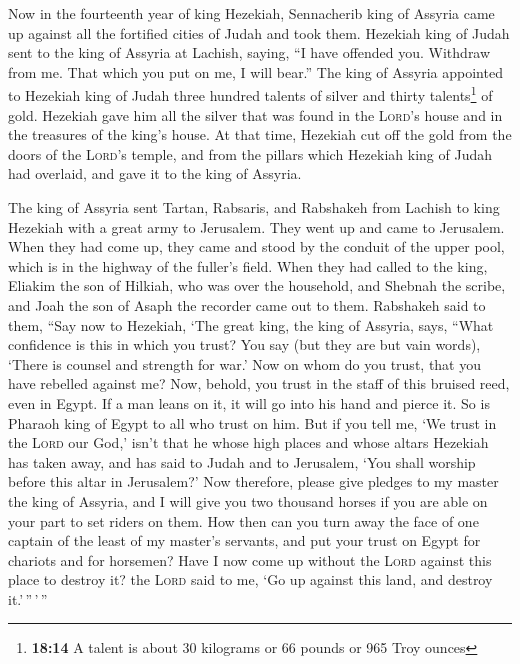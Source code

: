  Now in the fourteenth year of king Hezekiah, Sennacherib
king of Assyria came up against all the fortified cities of Judah and
took them.  Hezekiah king of Judah sent to the king of
Assyria at Lachish, saying, ``I have offended you. Withdraw from me.
That which you put on me, I will bear.'' The king of Assyria appointed
to Hezekiah king of Judah three hundred talents of silver and thirty
talents\footnote{\textbf{18:14} A talent is about 30 kilograms or 66
  pounds or 965 Troy ounces} of gold.  Hezekiah gave him
all the silver that was found in the \textsc{Lord}'s house and in the
treasures of the king's house.  At that time, Hezekiah
cut off the gold from the doors of the \textsc{Lord}'s temple, and from
the pillars which Hezekiah king of Judah had overlaid, and gave it to
the king of Assyria.

 The king of Assyria sent Tartan, Rabsaris, and Rabshakeh
from Lachish to king Hezekiah with a great army to Jerusalem. They went
up and came to Jerusalem. When they had come up, they came and stood by
the conduit of the upper pool, which is in the highway of the fuller's
field.  When they had called to the king, Eliakim the son
of Hilkiah, who was over the household, and Shebnah the scribe, and Joah
the son of Asaph the recorder came out to them. 
Rabshakeh said to them, ``Say now to Hezekiah, `The great king, the king
of Assyria, says, ``What confidence is this in which you trust?
 You say (but they are but vain words), `There is counsel
and strength for war.' Now on whom do you trust, that you have rebelled
against me?  Now, behold, you trust in the staff of this
bruised reed, even in Egypt. If a man leans on it, it will go into his
hand and pierce it. So is Pharaoh king of Egypt to all who trust on him.
 But if you tell me, `We trust in the \textsc{Lord} our
God,' isn't that he whose high places and whose altars Hezekiah has
taken away, and has said to Judah and to Jerusalem, `You shall worship
before this altar in Jerusalem?'  Now therefore, please
give pledges to my master the king of Assyria, and I will give you two
thousand horses if you are able on your part to set riders on them.
 How then can you turn away the face of one captain of
the least of my master's servants, and put your trust on Egypt for
chariots and for horsemen?  Have I now come up without
the \textsc{Lord} against this place to destroy it? the \textsc{Lord}
said to me, `Go up against this land, and destroy it.'\,''\,'\,''

